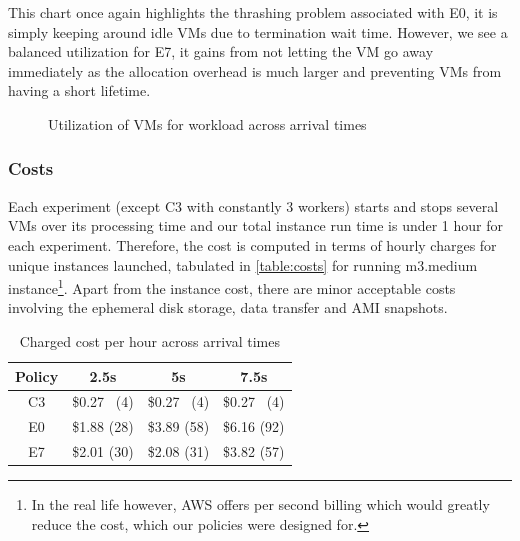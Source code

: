 \documentclass[a4paper]{IEEEtran}
\begin{document}
This chart once again highlights the thrashing problem associated with \textsc{E0}, it is simply keeping around idle VMs due to termination wait time. However, we see a balanced utilization for \textsc{E7}, it gains from not letting the VM go away immediately as the allocation overhead is much larger and preventing VMs from having a short lifetime.

\begin{figure}[tbp]
  \caption{Utilization of VMs for workload across arrival times}
  \label{fig:utilization}
\end{figure}

\subsubsection{Costs}

Each experiment (except C3 with constantly 3 workers) starts and stops several VMs over its processing time and our total instance run time is under 1 hour for each experiment. Therefore, the cost is computed in terms of hourly charges for unique instances launched, tabulated in \autoref{table:costs} for running m3.medium instance\footnote{In the real life however, AWS offers per second billing which would greatly reduce the cost, which our policies were designed for.}. Apart from the instance cost, there are minor acceptable costs involving the ephemeral disk storage, data transfer and AMI snapshots.

\begin{table}[hbp]
  \centering
  \caption{Charged cost per hour across arrival times}
  \label{table:costs}
  \begin{tabular}{|c|c|c|c|}
    \hline
    Policy & 2.5s & 5s & 7.5s \\
    \hline
    C3 & \$0.27 ~(4) & \$0.27 ~(4) & \$0.27 ~(4) \\
    E0 & \$1.88 (28) & \$3.89 (58) & \$6.16 (92) \\
    E7 & \$2.01 (30) & \$2.08 (31) & \$3.82 (57) \\
    \hline
  \end{tabular}
\end{table}
\end{document}
